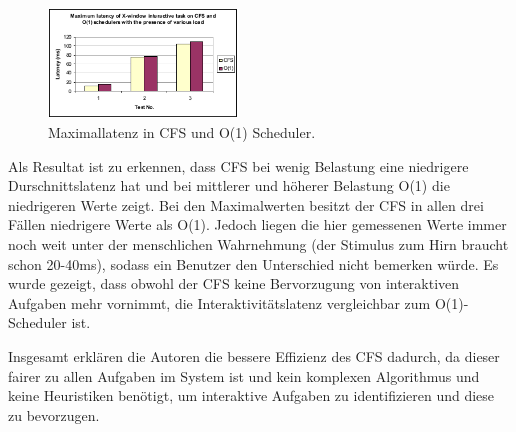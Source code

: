 \begin{figure} [h]
 	\centering
 	\includegraphics[width=0.45\textwidth]{pictures/max_latency.png}
 	\caption{Maximallatenz in CFS und O(1) Scheduler.}
 	\label{fig:max_latency}
\end{figure}
Als Resultat ist zu erkennen, dass CFS bei wenig Belastung eine niedrigere Durschnittslatenz hat und bei mittlerer und höherer Belastung O(1) die niedrigeren Werte zeigt. Bei den Maximalwerten besitzt der CFS in allen drei Fällen niedrigere Werte als O(1). Jedoch liegen die hier gemessenen Werte immer noch weit unter der menschlichen Wahrnehmung (der Stimulus zum Hirn braucht schon 20-40ms), sodass ein Benutzer den Unterschied nicht bemerken würde. Es wurde gezeigt, dass obwohl der CFS keine Bervorzugung von interaktiven Aufgaben mehr vornimmt, die Interaktivitätslatenz vergleichbar zum O(1)-Scheduler ist. 

Insgesamt erklären die Autoren die bessere Effizienz des CFS dadurch, da dieser fairer zu allen Aufgaben im System ist und kein komplexen Algorithmus und keine Heuristiken benötigt, um interaktive Aufgaben zu identifizieren und diese zu bevorzugen.